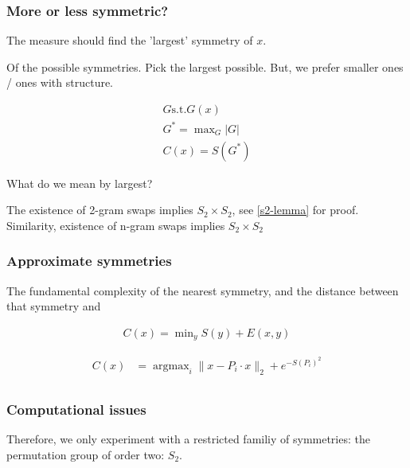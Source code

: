 \subsubsection{More or less symmetric?}

The measure should find the 'largest' symmetry of $x$.

Of the possible symmetries. Pick the largest possible. But, we prefer smaller ones / ones with structure.

\begin{align*}
G \text{s.t.} G(x) \\
G^{* } = \mathop{\text{max}}_G |G| \\
C(x) = S(G^{* })
\end{align*}

What do we mean by largest?

The existence of 2-gram swaps implies $S_2 \times S_2$, see \ref{s2-lemma} for proof.
Similarity, existence of n-gram swaps implies $S_2 \times S_2$

\subsubsection{Approximate symmetries}

The fundamental complexity of the nearest symmetry, and the distance between that symmetry and

\begin{align*}
C(x) = \mathop{\text{min}}_y S(y) + E(x, y)
\end{align*}

\begin{align*}
C(x) &= \mathop{\text{argmax}}_i  \parallel x-P_i\cdot x\parallel_2 + e^{-S(P_i)^2}\\
\end{align*}


\subsubsection{Computational issues}

Therefore, we only experiment with a restricted familiy of symmetries: the permutation group of order two: $S_2$.


